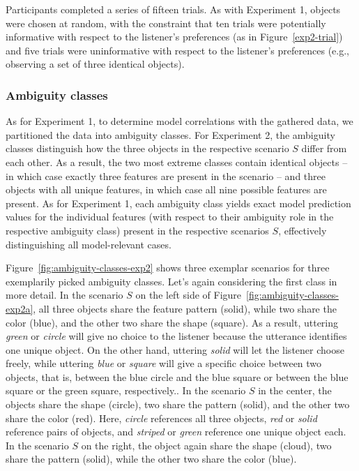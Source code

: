 \documentclass[10pt,a4paper]{article}
\begin{document}
Participants completed a series of fifteen trials. As with Experiment 1, objects were chosen at random, with the constraint that ten trials were potentially informative with respect to the listener's preferences (as in Figure~\ref{exp2-trial}) and five trials were uninformative with respect to the listener's preferences (e.g., observing a set of three identical objects).


\subsubsection*{Ambiguity classes}
As for Experiment 1, to determine model correlations with the gathered data, we partitioned the data into ambiguity classes. 
For Experiment 2, the ambiguity classes distinguish how the three objects in the respective scenario $S$ differ from each other.
As a result, the two most extreme classes contain identical objects -- in which case exactly three features are present in the scenario -- and three objects with all unique features, in which case all nine possible features are present. 
As for Experiment 1, each ambiguity class yields exact model prediction values for the individual features (with respect to their ambiguity role in the respective ambiguity class) present in the respective scenarios $S$, effectively distinguishing all model-relevant cases. 


Figure~\ref{fig:ambiguity-classes-exp2} shows three exemplar scenarios for three exemplarily picked ambiguity classes. 
Let's again considering the first class in more detail.
In the scenario $S$ on the left side of Figure~\ref{fig:ambiguity-classes-exp2a}, 
all three objects share the feature pattern (solid), while two share the color (blue), and the other two share the shape (square).
As a result, uttering \textit{green} or \textit{circle} will give no choice to the listener because the utterance identifies one unique object. 
On the other hand, uttering \textit{solid} will let the listener choose freely, while uttering \textit{blue} or \textit{square} will give a specific choice between two objects, that is, between the blue circle and the blue square or between the blue square or the green square, respectively..
In the scenario $S$ in the center, the objects share the shape (circle), two share the pattern (solid), and the other two share the color (red).
Here, \textit{circle} references all three objects, \textit{red} or \textit{solid} reference pairs of objects, and \textit{striped} or \textit{green} reference one unique object each.
In the scenario $S$ on the right, the object again share the shape (cloud), two share the pattern (solid), while the other two share the color (blue).
\end{document}
